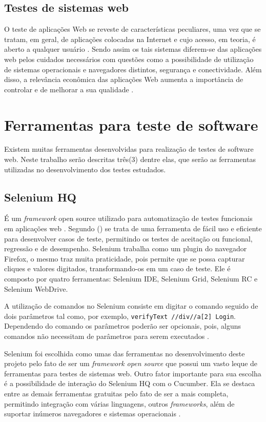 \documentclass[tg]{mdtufsm}
\begin{document}
\subsection{Testes de sistemas web}
O teste de aplicações Web se reveste de características peculiares, uma vez que se tratam, em geral, de aplicações colocadas na Internet e cujo acesso, em teoria, é aberto a qualquer usuário \cite{rios2006teste}. Sendo assim os tais sistemas diferem-se das aplicações web pelos cuidados necessários com questões como a possibilidade de utilização de sistemas operacionais e navegadores distintos, segurança e conectividade. Além
disso, a relevância econômica das aplicações Web aumenta a importância de controlar e de
melhorar a sua qualidade \cite{fidelis2004fireweb}.


\section{Ferramentas para teste de software}
Existem muitas ferramentas desenvolvidas para realização de testes de software web. Neste trabalho serão descritas três(3) dentre elas, que serão as ferramentas utilizadas no desenvolvimento dos testes estudados.

\subsection{Selenium HQ}
É um \emph{framework} open source utilizado para automatização de testes funcionais em aplicações web \cite{chiavegatto1desenvolvimento}. Segundo \citeauthor{pereiraestudoselenium} (\citeyear{pereiraestudoselenium}) se trata
de uma ferramenta de fácil uso e eficiente para desenvolver casos de teste, permitindo os testes de aceitação ou funcional, regressão e de desempenho.
Selenium trabalha como um plugin do navegador Firefox, o mesmo traz muita praticidade, pois permite que se possa capturar cliques e valores digitados, transformando-os em um caso de teste. Ele é composto por
quatro ferramentas: Selenium IDE, Selenium Grid, Selenium RC e Selenium WebDrive.

A utilização de comandos no Selenium consiste em digitar o comando seguido de dois parâmetros tal como, por exemplo, \texttt{verifyText //div//a[2] Login}. Dependendo  do comando os parâmetros poderão ser opcionais, pois, alguns comandos não necessitam de parâmetros para serem executados \cite{sixpenceautomatizaccao}.

Selenium foi escolhida como umas das ferramentas no desenvolvimento deste projeto pelo fato de ser um \emph{framework open source} que possui um vasto leque de ferramentas para testes de sistemas web. Outro fator
importante para sua escolha é a possibilidade de interação do Selenium HQ com o Cucumber. Ela se destaca entre as demais ferramentas gratuitas pelo fato de ser a mais completa, permitindo integração com
várias linguagens, outros \emph{frameworks}, além de suportar inúmeros navegadores e sistemas operacionais \cite{pereiraestudoselenium}.
\end{document}
